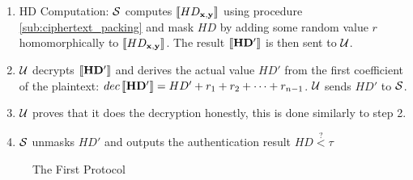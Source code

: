 \begin{description}
\begin{enumerate}
\item HD Computation: $\mathcal{S}$ computes $\left\llbracket HD_{\mathbf{x,y}}\right\rrbracket$ using
  procedure \ref{sub:ciphertext_packing} and mask $HD$ by adding some random
  value $r$ homomorphically to $\left\llbracket HD_{\mathbf{x,y}}\right\rrbracket$. The result
  $\left\llbracket\mathbf{HD'}\right\rrbracket$ is then sent to $\mathcal{U}$.
\item \(\mathcal{U}\) decrypts $\left\llbracket\mathbf{HD'}\right\rrbracket$ and derives the actual value
  ${HD'}$ from the first coefficient of the plaintext:
  \( dec\left\llbracket\mathbf{HD'}\right\rrbracket = HD' + r_1 + r_2 + \dots + r_{n-1} \). \(\mathcal{U}\)
  sends \(HD'\) to \(\mathcal{S}\).
\item \(\mathcal{U}\) proves that it does the decryption honestly, this is done
  similarly to step 2.
\item \(\mathcal{S}\) unmasks \(HD'\) and outputs the authentication result
  \(HD \stackrel{?}{<} \tau\)
  \end{enumerate}

\end{description}

\begin{figure}[htbp!] 
  \centering {}
  \caption{The First Protocol}
  \label{fig:firstProtocol}
\end{figure}

